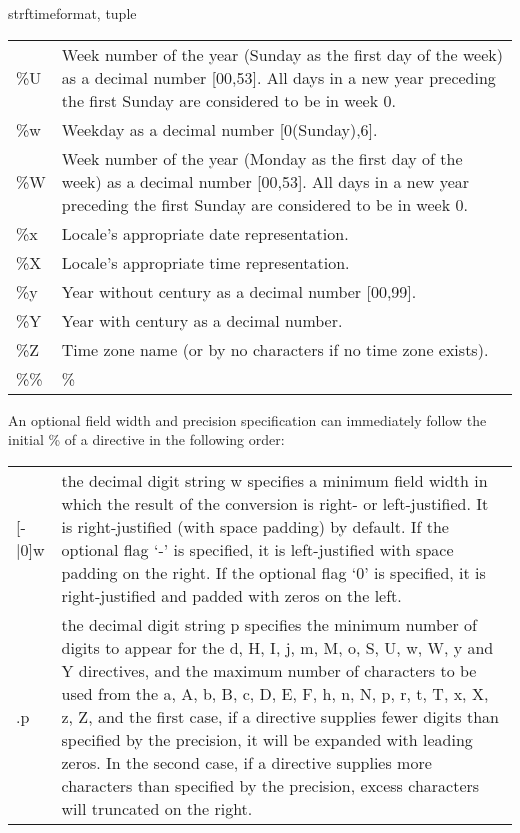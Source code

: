 \begin{funcdesc}{strftime}{format, tuple}
\begin{tabular}{lp{25em}}
           \%U  &      Week number of the year (Sunday as the first day of the
                     week) as a decimal number [00,53].  All days in a new
                     year preceding the first Sunday are considered to be in
                     week 0. \\
           \%w  &      Weekday as a decimal number [0(Sunday),6]. \\
           \%W  &      Week number of the year (Monday as the first day of the
                     week) as a decimal number [00,53].  All days in a new
                     year preceding the first Sunday are considered to be in
                     week 0. \\
           \%x  &      Locale's appropriate date representation. \\
           \%X  &      Locale's appropriate time representation. \\
           \%y  &      Year without century as a decimal number [00,99]. \\
           \%Y  &      Year with century as a decimal number. \\
           \%Z  &      Time zone name (or by no characters if no time zone
                     exists). \\
           \%\%  &     \% \\
\end{tabular}

      An optional field width and precision specification can immediately
      follow the initial \% of a directive in the following order: \\

\begin{tabular}{lp{25em}}
      [-|0]w  &       the decimal digit string w specifies a minimum field
                     width in which the result of the conversion is right-
                     or left-justified.  It is right-justified (with space
                     padding) by default.  If the optional flag `-' is
                     specified, it is left-justified with space padding on
                     the right.  If the optional flag `0' is specified, it
                     is right-justified and padded with zeros on the left. \\
      .p      &       the decimal digit string p specifies the minimum number
                     of digits to appear for the d, H, I, j, m, M, o, S, U,
                     w, W, y and Y directives, and the maximum number of
                     characters to be used from the a, A, b, B, c, D, E, F,
                     h, n, N, p, r, t, T, x, X, z, Z, and %
                     the first case, if a directive supplies fewer digits
                     than specified by the precision, it will be expanded
                     with leading zeros.  In the second case, if a directive
                     supplies more characters than specified by the
                     precision, excess characters will truncated on the
                     right.
\end{tabular}


\end{funcdesc}
